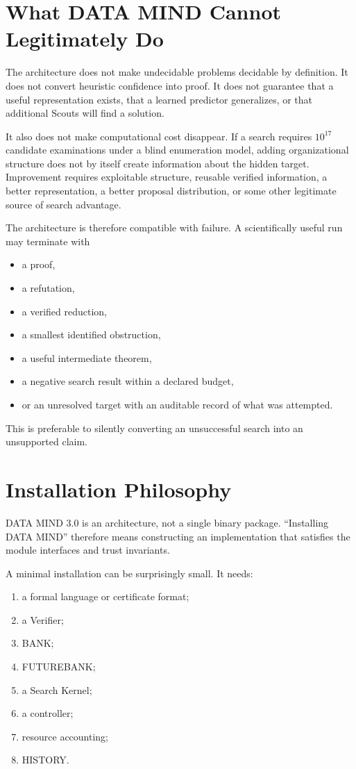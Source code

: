 \documentclass[11pt]{article}
\begin{document}
\section{What DATA MIND Cannot Legitimately Do}

The architecture does not make undecidable problems decidable by definition. It does not convert heuristic confidence into proof. It does not guarantee that a useful representation exists, that a learned predictor generalizes, or that additional Scouts will find a solution.

It also does not make computational cost disappear. If a search requires $10^{17}$ candidate examinations under a blind enumeration model, adding organizational structure does not by itself create information about the hidden target. Improvement requires exploitable structure, reusable verified information, a better representation, a better proposal distribution, or some other legitimate source of search advantage.

The architecture is therefore compatible with failure. A scientifically useful run may terminate with
\begin{itemize}
\item a proof,
\item a refutation,
\item a verified reduction,
\item a smallest identified obstruction,
\item a useful intermediate theorem,
\item a negative search result within a declared budget,
\item or an unresolved target with an auditable record of what was attempted.
\end{itemize}

This is preferable to silently converting an unsuccessful search into an unsupported claim.

\section{Installation Philosophy}

DATA MIND 3.0 is an architecture, not a single binary package. ``Installing DATA MIND'' therefore means constructing an implementation that satisfies the module interfaces and trust invariants.

A minimal installation can be surprisingly small. It needs:
\begin{enumerate}
\item a formal language or certificate format;
\item a Verifier;
\item BANK;
\item FUTUREBANK;
\item a Search Kernel;
\item a controller;
\item resource accounting;
\item HISTORY.
\end{enumerate}
\end{document}
